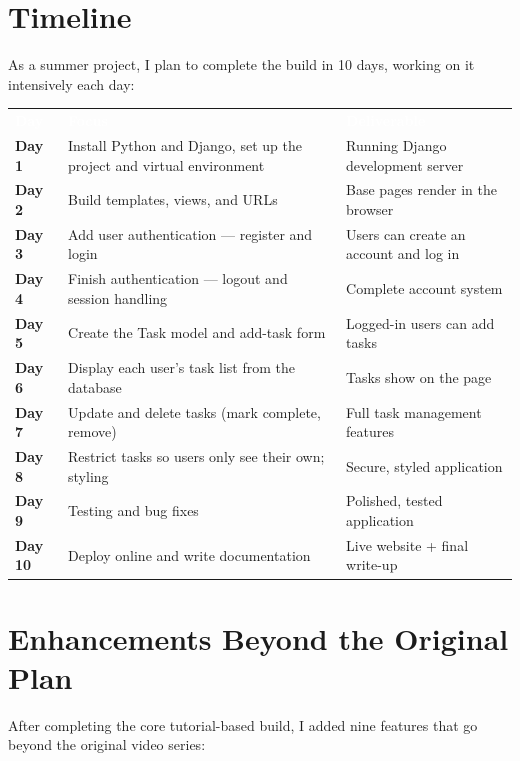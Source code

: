 \documentclass[11pt]{article}
\begin{document}
\section{Timeline}
As a summer project, I plan to complete the build in 10 days, working on it intensively each day:

\vspace{6pt}
\renewcommand{\arraystretch}{1.3}
\begin{tabularx}{\textwidth}{>{\bfseries}p{1.3cm} Y p{4.7cm}}
\textcolor{white}{\textbf{Day}} & \textcolor{white}{\textbf{Focus}} & \textcolor{white}{\textbf{Deliverable}} \\
Day 1 & Install Python and Django, set up the project and virtual environment & Running Django development server \\
Day 2 & Build templates, views, and URLs & Base pages render in the browser \\
Day 3 & Add user authentication --- register and login & Users can create an account and log in \\
Day 4 & Finish authentication --- logout and session handling & Complete account system \\
Day 5 & Create the Task model and add-task form & Logged-in users can add tasks \\
Day 6 & Display each user's task list from the database & Tasks show on the page \\
Day 7 & Update and delete tasks (mark complete, remove) & Full task management features \\
Day 8 & Restrict tasks so users only see their own; styling & Secure, styled application \\
Day 9 & Testing and bug fixes & Polished, tested application \\
Day 10 & Deploy online and write documentation & Live website + final write-up \\
\end{tabularx}

\section{Enhancements Beyond the Original Plan}
\label{sec:enhancements}
After completing the core tutorial-based build, I added nine features that go beyond the original video series:
\end{document}
